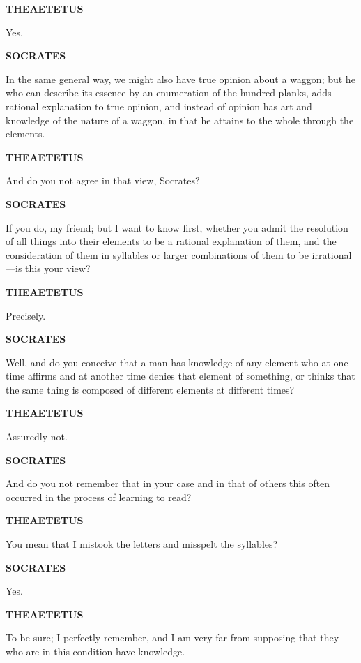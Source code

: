 \documentclass[11pt,letter]{article}
\begin{document}
\par \textbf{THEAETETUS}
\par   Yes.

\par \textbf{SOCRATES}
\par   In the same general way, we might also have true opinion about a waggon; but he who can describe its essence by an enumeration of the hundred planks, adds rational explanation to true opinion, and instead of opinion has art and knowledge of the nature of a waggon, in that he attains to the whole through the elements.

\par \textbf{THEAETETUS}
\par   And do you not agree in that view, Socrates?

\par \textbf{SOCRATES}
\par   If you do, my friend; but I want to know first, whether you admit the resolution of all things into their elements to be a rational explanation of them, and the consideration of them in syllables or larger combinations of them to be irrational—is this your view?

\par \textbf{THEAETETUS}
\par   Precisely.

\par \textbf{SOCRATES}
\par   Well, and do you conceive that a man has knowledge of any element who at one time affirms and at another time denies that element of something, or thinks that the same thing is composed of different elements at different times?

\par \textbf{THEAETETUS}
\par   Assuredly not.

\par \textbf{SOCRATES}
\par   And do you not remember that in your case and in that of others this often occurred in the process of learning to read?

\par \textbf{THEAETETUS}
\par   You mean that I mistook the letters and misspelt the syllables?

\par \textbf{SOCRATES}
\par   Yes.

\par \textbf{THEAETETUS}
\par   To be sure; I perfectly remember, and I am very far from supposing that they who are in this condition have knowledge.
\end{document}
